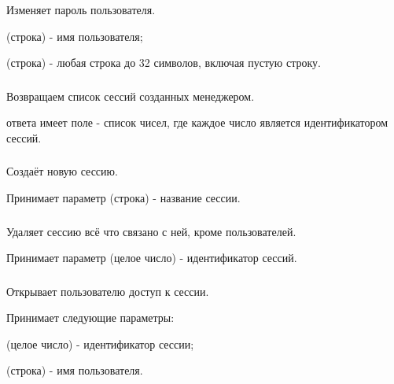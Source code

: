 Изменяет пароль пользователя.

\begin{icItems}
	\item {} (строка) - имя пользователя;
	\item {} (строка) - любая строка до 32 символов, включая пустую строку.
\end{icItems}

\subsubsection{}

Возвращаем список сессий созданных менеджером.

 ответа имеет поле  - список чисел, где каждое число является идентификатором сессий.

\subsubsection{}

Создаёт новую сессию.

Принимает параметр  (строка) - название сессии.

\subsubsection{}

Удаляет сессию всё что связано с ней, кроме пользователей.

Принимает параметр  (целое число) - идентификатор сессий.

\subsubsection{}

Открывает пользователю доступ к сессии.

Принимает следующие параметры:

\begin{icItems}
	\item {} (целое число) - идентификатор сессии;
	\item {} (строка) - имя пользователя.
\end{icItems}

\subsubsection{}

